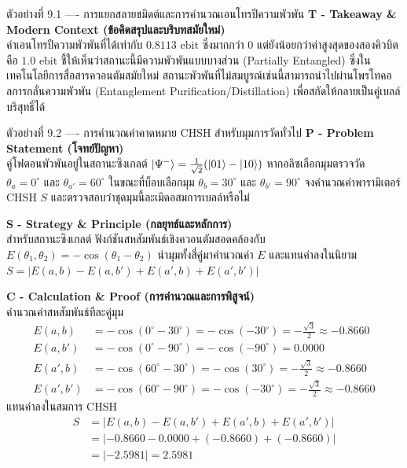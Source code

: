 \begin{psctbox}{ตัวอย่างที่ 9.1 ---- การแยกสลายชมิดต์และการคำนวณเอนโทรปีความพัวพัน}
\vspace{4pt}
\noindent\textbf{T - Takeaway \& Modern Context (ข้อคิดสรุปและบริบทสมัยใหม่)} \\
ค่าเอนโทรปีความพัวพันที่ได้เท่ากับ $0.8113\text{ ebit}$ ซึ่งมากกว่า 0 แต่ยังน้อยกว่าค่าสูงสุดของสองคิวบิตคือ $1.0\text{ ebit}$ ชี้ให้เห็นว่าสถานะนี้มีความพัวพันแบบบางส่วน (Partially Entangled) ซึ่งในเทคโนโลยีการสื่อสารควอนตัมสมัยใหม่ สถานะพัวพันที่ไม่สมบูรณ์เช่นนี้สามารถนำไปผ่านโพรโทคอลการกลั่นความพัวพัน (Entanglement Purification/Distillation) เพื่อสกัดให้กลายเป็นคู่เบลล์บริสุทธิ์ได้
\end{psctbox}

\begin{psctbox}{ตัวอย่างที่ 9.2 ---- การคำนวณค่าคาดหมาย CHSH สำหรับมุมการวัดทั่วไป}
\noindent\textbf{P - Problem Statement (โจทย์ปัญหา)} \\
คู่โฟตอนพัวพันอยู่ในสถานะซิงเกลต์ $\ket{\Psi^-} = \frac{1}{\sqrt{2}}(\ket{01}-\ket{10})$ หากอลิซเลือกมุมตรวจวัด $\theta_a = 0^\circ$ และ $\theta_{a'} = 60^\circ$ ในขณะที่บ็อบเลือกมุม $\theta_b = 30^\circ$ และ $\theta_{b'} = 90^\circ$ จงคำนวณค่าพารามิเตอร์ CHSH $S$ และตรวจสอบว่าชุดมุมนี้ละเมิดอสมการเบลล์หรือไม่

\vspace{4pt}
\noindent\textbf{S - Strategy \& Principle (กลยุทธ์และหลักการ)} \\
สำหรับสถานะซิงเกลต์ ฟังก์ชันสหสัมพันธ์เชิงควอนตัมสอดคล้องกับ $E(\theta_1, \theta_2) = -\cos(\theta_1 - \theta_2)$ นำมุมทั้งสี่คู่มาคำนวณค่า $E$ และแทนค่าลงในนิยาม $S = |E(a, b) - E(a, b') + E(a', b) + E(a', b')|$

\vspace{4pt}
\noindent\textbf{C - Calculation \& Proof (การคำนวณและการพิสูจน์)} \\
คำนวณค่าสหสัมพันธ์ทีละคู่มุม
\begin{align}
E(a, b) &= -\cos(0^\circ - 30^\circ) = -\cos(-30^\circ) = -\frac{\sqrt{3}}{2} \approx -0.8660 \\
E(a, b') &= -\cos(0^\circ - 90^\circ) = -\cos(-90^\circ) = 0.0000 \\
E(a', b) &= -\cos(60^\circ - 30^\circ) = -\cos(30^\circ) = -\frac{\sqrt{3}}{2} \approx -0.8660 \\
E(a', b') &= -\cos(60^\circ - 90^\circ) = -\cos(-30^\circ) = -\frac{\sqrt{3}}{2} \approx -0.8660
\end{align}
แทนค่าลงในสมการ CHSH
\begin{align}
S &= |E(a, b) - E(a, b') + E(a', b) + E(a', b')| \nonumber \\
&= \left| -0.8660 - 0.0000 + (-0.8660) + (-0.8660) \right| \nonumber \\
&= |-2.5981| = 2.5981
\end{align}


\end{psctbox}
